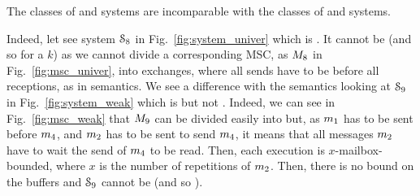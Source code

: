 %
     
%   


The classes of \wS{} and  systems are incomparable with the classes of \eb{} and \ub{} systems.

Indeed, let see system $\mathcal{S}_{8}$ in Fig.~\ref{fig:system_univer} which is . It cannot be \wS{} (and so  for a $k$) as we cannot divide a corresponding MSC, as $M_{8}$ in Fig.~\ref{fig:msc_univer}, into exchanges, where all sends have to be before all receptions, as in \pp semantics.
We see a difference with the \pp semantics looking at $\mathcal{S}_{9}$ in
Fig.~\ref{fig:system_weak} which is \wS{} but not \eb{}. Indeed, we can see in
Fig.~\ref{fig:msc_weak} that $M_{9}$ can be divided easily into  but,
as $m_1$ has to be sent before $m_4$, and $m_2$ has to be sent to send
$m_4$,  it means  that all messages $m_2$ have to wait the send of
$m_4$ to be read.  Then, each execution is $x$-mailbox-bounded, where $x$ is
the number of repetitions of $m_2$. Then, there is no bound on the buffers
and $\mathcal{S}_{9}$ cannot be \eb{} (and so \ub{}).



\begin{center}
  \begin{minipage}[c]{6cm}
    
\end{minipage}
\hspace*{1cm}
\begin{minipage}[c]{3.5cm}
  
\end{minipage}
\end{center}


